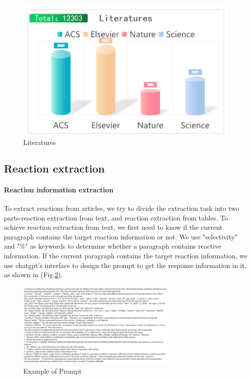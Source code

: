 \documentclass[%
 aip,
 jmp,%
 amsmath,amssymb,
 reprint,%
]{revtex4-2}
\begin{document}
\begin{figure}[htbp]
 \centering
 \includegraphics[width=1\textwidth]{figure/17.png}
 \caption{ Literatures }
 \label{ Fig.17 }
\end{figure}



\subsection{Reaction extraction}

\paragraph{Reaction information extraction}To extract reactions from articles, we try to divide the extraction task into two parts-reaction extraction from text, and reaction extraction from tables. To achieve reaction extraction from text, we first need to know if the current paragraph contains the target reaction information or not. We use "selectivity" and "\%" as keywords to determine whether a paragraph contains reactive information.
If the current paragraph contains the target reaction information, we use chatgpt's interface to design the prompt to get the response information in it, as shown in (Fig.\ref{ Fig.18 }). 
\begin{figure}[htbp]
 \centering
 \includegraphics[width=0.7\textwidth]{figure/18.png}
 \caption{ Example of Prompt }
 \label{ Fig.18 }
\end{figure}
\end{document}
